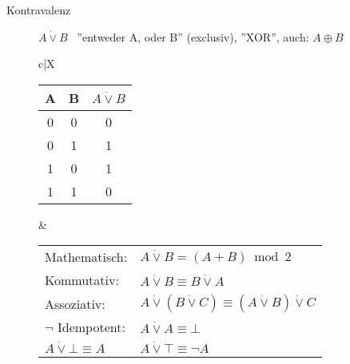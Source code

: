 \documentclass[12pt,a4paper]{article}
\begin{document}
\begin{description}
\begin{description}
			\item[Kontravalenz] $A\dot{\vee}B$ \, ''entweder A, oder B'' (exclusiv), ''XOR'', auch: $A\oplus B$ \\
				\begin{tabularx}{\linewidth}{c|X}
					\begin{tabular}[t]{c|c||c}
						A & B & $A \dot{\vee} B$ \\ \hline\hline
						0 & 0 & 0 \\ \hline
						0 & 1 & 1 \\ \hline
						1 & 0 & 1 \\ \hline
						1 & 1 & 0
					\end{tabular} &
					\begin{tabular}[t]{ll}
						Mathematisch: & $A \dot{\vee} B = (A + B)\bmod 2$ \\
						Kommutativ: & $A \dot{\vee} B \equiv B \dot{\vee} A$ \\
						Assoziativ: & $A \dot{\vee} (B \dot{\vee} C) \equiv (A \dot{\vee} B) \dot{\vee} C$ \\
						$\neg$ Idempotent: & $A \dot{\vee} A \equiv \bot$ \\
						$A \dot{\vee} \bot \equiv A$ & $A \dot{\vee} \top \equiv \neg A$
					\end{tabular} \\ \hline
				\end{tabularx}
				

\end{description}
\end{description}
\end{document}
